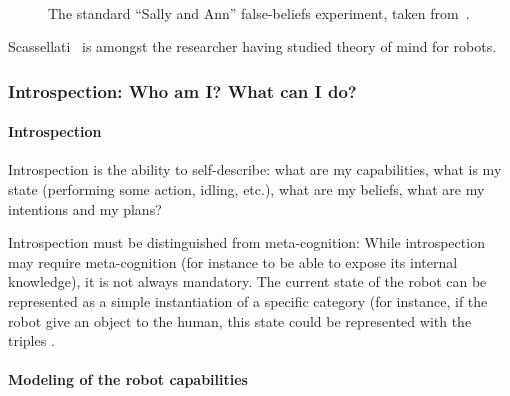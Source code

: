 \begin{figure}
        \centering
         \hspace{15pt} %
         \\
         \hspace{15pt} %
        \caption{The standard ``Sally and Ann'' false-beliefs experiment, taken
        from~\cite{Leslie2000}.}

        \label{fig|sally-ann}
\end{figure}

Scassellati~\cite{Scassellati2002} is amongst the researcher having studied
theory of mind for robots.



\subsubsection{Introspection: Who am I? What can I do?}
\label{sect|introspection}

\paragraph{Introspection}

Introspection is the ability to self-describe: what are my capabilities, what
is my state (performing some action, idling, etc.), what are my beliefs, what
are my intentions and my plans?

Introspection must be distinguished from meta-cognition: While introspection
may require meta-cognition (for instance to be able to expose its internal
knowledge), it is not always mandatory. The current state of the robot can be
represented as a simple instantiation of a specific category (for instance, if
the robot give an object to the human, this state could be represented with the
triples .

\paragraph{Modeling of the robot capabilities}

